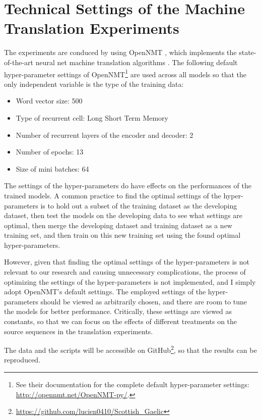 \documentclass[a4paper]{article}
\begin{document}

\section{Technical Settings of the Machine Translation Experiments}\label{sec:experimet_setting}
The experiments are conduced by using OpenNMT \citep{2017opennmt}, which implements the state-of-the-art neural net machine translation algorithms \citep{cho2014properties, cho2014learning, bahdanau2014neural}. 
The following default hyper-parameter settings of OpenNMT\footnote{See their documentation for the complete default hyper-parameter settings: \url{http://opennmt.net/OpenNMT-py/}.} are used across all models so that the only independent variable is the type of the training data: 
\begin{itemize}
\item Word vector size: 500
\item Type of recurrent cell: Long Short Term Memory
\item Number of recurrent layers of the encoder and decoder: 2
\item Number of epochs: 13 
\item Size of mini batches: 64 
\end{itemize}

The settings of the hyper-parameters do have effects on the performances of the trained models. 
A common practice to find the optimal settings of the hyper-parameters is to hold out a subset of the training dataset as the developing dataset, then test the models on the developing data to see what settings are optimal, then merge the developing dataset and training dataset as a new training set, and then train on this new training set using the found optimal hyper-parameters. 

However, given that finding the optimal settings of the hyper-parameters is not relevant to our research and causing unnecessary complications, the process of optimizing the settings of the hyper-parameters is not implemented, and I simply adopt OpenNMT's default settings. The employed settings of the hyper-parameters should be viewed as arbitrarily chosen, and there are room to tune the models for better performance. Critically, these settings are viewed as constants, so that we can focus on the effects of different treatments on the source sequences in the translation experiments.

The data and the scripts will be accessible on GitHub\footnote{\url{https://github.com/lucien0410/Scottish_Gaelic}}, so that the results can be reproduced.   
\end{document}
